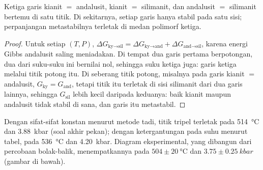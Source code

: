 \begin{proposition}\label{prop:b2:metamorphic-facies:triple}
Ketiga garis kianit $=$ andalusit, kianit $=$ silimanit, dan andalusit $=$
silimanit bertemu di satu titik. Di sekitarnya, setiap garis hanya stabil pada satu sisi; perpanjangan
metastabilnya terletak di medan polimorf ketiga.
\end{proposition}

\begin{proof}
Untuk setiap $(T, P)$, $\Delta G_{\text{ky}\to\text{sil}} = \Delta G_{\text{ky}\to\text{and}} +
\Delta G_{\text{and}\to\text{sil}}$, karena energi Gibbs andalusit saling meniadakan. Di tempat
dua garis pertama berpotongan, dua dari suku-suku ini bernilai nol, sehingga suku ketiga juga: garis ketiga
melalui titik potong itu. Di seberang titik potong, misalnya pada garis kianit $=$ andalusit,
$G_{\text{ky}} = G_{\text{and}}$, tetapi titik itu terletak di sisi silimanit dari
dua garis lainnya, sehingga $G_{\text{sil}}$ lebih kecil daripada keduanya: baik kianit maupun andalusit
tidak stabil di sana, dan garis itu metastabil.
\end{proof}

Dengan sifat-sifat konstan menurut metode tadi, titik tripel terletak pada
\qty{514}{\celsius} dan \qty{3.88}{kbar} (soal akhir pekan); dengan ketergantungan pada suhu
menurut tabel, pada \qty{536}{\celsius} dan \qty{4.20}{kbar}. Diagram
eksperimental, yang dibangun dari percobaan bolak-balik, menempatkannya pada $504 \pm \qty{20}{\celsius}$ dan
$3.75 \pm \qty{0.25}{kbar}$ (gambar di bawah).

